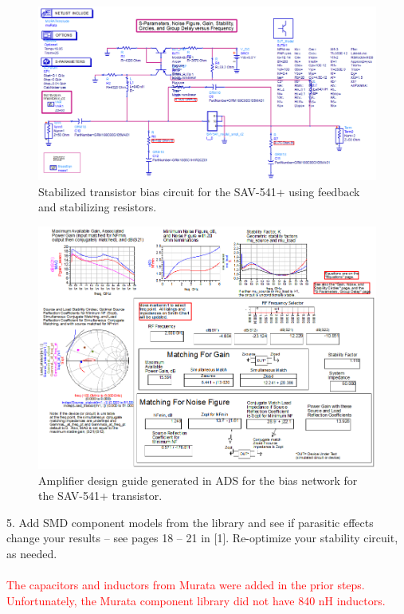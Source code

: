 \documentclass[conference]{IEEEtran}
\begin{document}
\begin{figure}[!h]
\centering
\includegraphics[scale=0.26]{pics/DesignGuideStablizedCircuit.png}
\caption{Stabilized transistor bias circuit for the SAV-541+ using feedback and stabilizing resistors.}
\label{fig:designcuidecircuitstabilized}
\end{figure}
\begin{figure}[!h]
\centering
\includegraphics[scale=0.35]{pics/DesignGuideStablizedSimulation.png}
\caption{Amplifier design guide generated in ADS for the bias network for the SAV-541+ transistor.}
\label{fig:designcuidesimulationstabilized}
\end{figure}

5. Add SMD component models from the library and see if parasitic effects change your results – see pages 18 – 21 in [1]. Re-optimize your stability circuit, as needed.\\\\
\textcolor{red}{The capacitors and inductors from Murata were added in the prior steps.  Unfortunately, the Murata component library did not have 840 nH inductors.}
\end{document}
